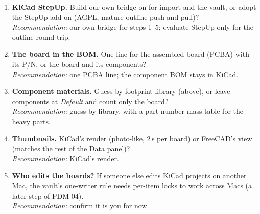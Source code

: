 \begin{enumerate}
  \item \textbf{KiCad StepUp.} Build our own bridge on  for import and the vault, or adopt the
        StepUp add-on (AGPL, mature outline push and pull)?\\
        \emph{Recommendation:} our own bridge for steps 1--5; evaluate StepUp only for the outline round trip.
  \item \textbf{The board in the BOM.} One line for the assembled board (PCBA) with its P/N, or the board and its
        components?\\
        \emph{Recommendation:} one PCBA line; the component BOM stays in KiCad.
  \item \textbf{Component materials.} Guess by footprint library (above), or leave components at \emph{Default} and
        count only the board?\\
        \emph{Recommendation:} guess by library, with a part-number mass table for the heavy parts.
  \item \textbf{Thumbnails.} KiCad's render (photo-like, 2\,s per board) or FreeCAD's view (matches the rest of
        the Data panel)?\\
        \emph{Recommendation:} KiCad's render.
  \item \textbf{Who edits the boards?} If someone else edits KiCad projects on another Mac, the vault's
        one-writer rule needs per-item locks to work across Macs (a later step of PDM-04).\\
        \emph{Recommendation:} confirm it is you for now.
\end{enumerate}
